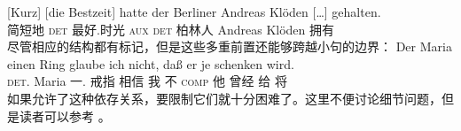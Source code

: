 \ex 
\gll {}[Kurz] [die Bestzeit] hatte der Berliner Andreas Klöden [\ldots] gehalten.\footnotemark\\
	 \spacebr{}简短地 \spacebr{}\textsc{det} 最好.时光 \textsc{aux} \textsc{det} 柏林人 Andreas Klöden {} 拥有\\
\label{bsp-kurz-die-bestzeit}     
\zl
尽管相应的结构都有标记，但是这些多重前置还能够跨越小句的边界：
\ea 
\gll Der        Maria einen    Ring glaube  ich nicht, daß  er je   schenken wird.\footnotemark\\
     \textsc{det}.\dat{} Maria 一.\acc{} 戒指 相信 我   不    \textsc{comp} 他 曾经 给     将\\
\z
如果允许了这种依存关系，要限制它们就十分困难了。这里不便讨论细节问题，但是读者可以参考 。

